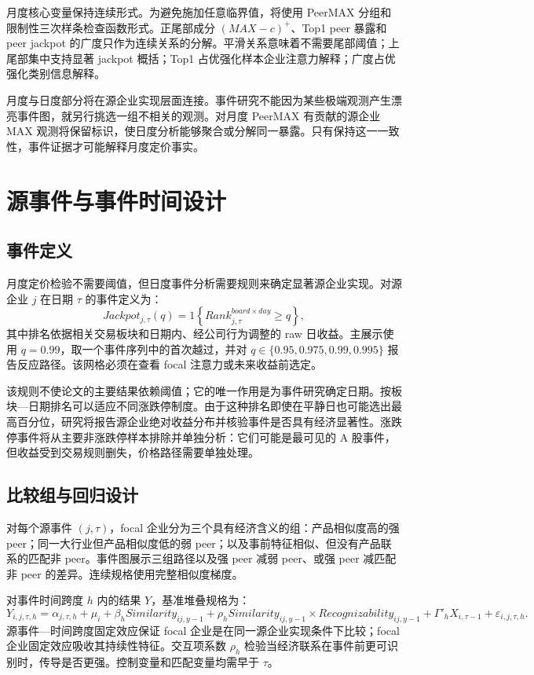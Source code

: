 \documentclass[UTF8,a4paper,11pt]{ctexart}
\begin{document}
月度核心变量保持连续形式。为避免施加任意临界值，将使用 PeerMAX 分组和限制性三次样条检查函数形式。正尾部成分 $(MAX-c)^+$、Top1 peer 暴露和 peer jackpot 的广度只作为连续关系的分解。平滑关系意味着不需要尾部阈值；上尾部集中支持显著 jackpot 概括；Top1 占优强化样本企业注意力解释；广度占优强化类别信息解释。

月度与日度部分将在源企业实现层面连接。事件研究不能因为某些极端观测产生漂亮事件图，就另行挑选一组不相关的观测。对月度 PeerMAX 有贡献的源企业 MAX 观测将保留标识，使日度分析能够聚合或分解同一暴露。只有保持这一一致性，事件证据才可能解释月度定价事实。

\section{源事件与事件时间设计}
\subsection{事件定义}
月度定价检验不需要阈值，但日度事件分析需要规则来确定显著源企业实现。对源企业 $j$ 在日期 $\tau$ 的事件定义为：
\begin{equation}
Jackpot_{j,\tau}(q)=1\left\{Rank^{board\times day}_{j,\tau}\ge q\right\},
\end{equation}
其中排名依据相关交易板块和日期内、经公司行为调整的 raw 日收益。主展示使用 $q=0.99$，取一个事件序列中的首次越过，并对 $q\in\{0.95,0.975,0.99,0.995\}$ 报告反应路径。该网格必须在查看 focal 注意力或未来收益前选定。

该规则不使论文的主要结果依赖阈值；它的唯一作用是为事件研究确定日期。按板块—日期排名可以适应不同涨跌停制度。由于这种排名即使在平静日也可能选出最高百分位，研究将报告源企业绝对收益分布并核验事件是否具有经济显著性。涨跌停事件将从主要非涨跌停样本排除并单独分析：它们可能是最可见的 A 股事件，但收益受到交易规则删失，价格路径需要单独处理。

\subsection{比较组与回归设计}
对每个源事件 $(j,\tau)$，focal 企业分为三个具有经济含义的组：产品相似度高的强 peer；同一大行业但产品相似度低的弱 peer；以及事前特征相似、但没有产品联系的匹配非 peer。事件图展示三组路径以及强 peer 减弱 peer、或强 peer 减匹配非 peer 的差异。连续规格使用完整相似度梯度。

对事件时间跨度 $h$ 内的结果 $Y$，基准堆叠规格为：
\begin{equation}
Y_{i,j,\tau,h}=\alpha_{j,\tau,h}+\mu_i+\beta_h Similarity_{ij,y-1}
+\rho_h Similarity_{ij,y-1}\times Recognizability_{ij,y-1}
+\Gamma'_hX_{i,\tau-1}+\varepsilon_{i,j,\tau,h}.
\end{equation}
源事件—时间跨度固定效应保证 focal 企业是在同一源企业实现条件下比较；focal 企业固定效应吸收其持续性特征。交互项系数 $\rho_h$ 检验当经济联系在事件前更可识别时，传导是否更强。控制变量和匹配变量均需早于 $\tau$。
\end{document}
